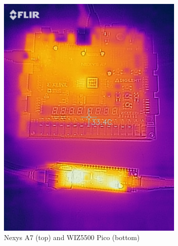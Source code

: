 \begin{figure}[h]
    \centering
    \begin{subfigure}[b]{0.45\textwidth} %
        \includegraphics[width=\textwidth]{Images/flir_2hs.jpg}
        \caption{Nexys A7 (top) and WIZ5500 Pico (bottom)}
        \label{fig:thermal_2hr_fpga_pico}
    \end{subfigure}
    \hfill %
    \begin{subfigure}[b]{0.45\textwidth} %

\end{subfigure}
\end{figure}
